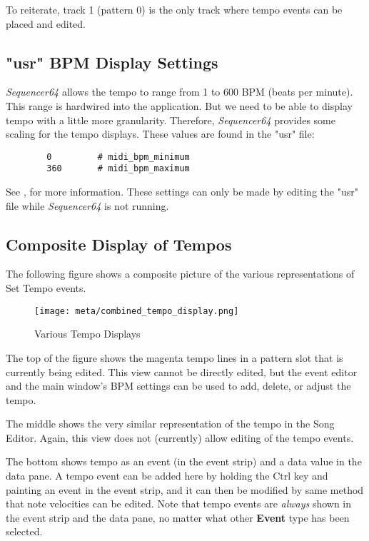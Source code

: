    To reiterate, track 1 (pattern 0) is the only track where tempo events
   can be placed and edited.

\subsection{"usr" BPM Display Settings}
\label{subsec:meta_events_usr}

   \textsl{Sequencer64} allows the tempo to range from 1 to 600 BPM
   (beats per minute).    This range is hardwired into the application.
   But we need to be able to display tempo with a little more granularity.
   Therefore, \textsl{Sequencer64} provides some scaling for the tempo
   displays.  These values are found in the "usr" file:

   \begin{verbatim}
		0         # midi_bpm_minimum
		360       # midi_bpm_maximum
   \end{verbatim}

   See , for more
   information.  These settings can only be made by editing the "usr" file
   while \textsl{Sequencer64} is not running.

\subsection{Composite Display of Tempos}
\label{subsec:meta_events_composite_display}

The following figure shows a composite picture of the various representations
of Set Tempo events.

\begin{figure}[H]
   \centering 
   \texttt{[image: meta/combined\_tempo\_display.png]}
   \caption{Various Tempo Displays}
   \label{fig:meta_events_tempo_displays}
\end{figure}

The top of the figure shows the magenta tempo lines in a pattern slot that
is currently being edited.  This view cannot be directly edited, but the event
editor and the main window's BPM settings can be used to add, delete, or adjust
the tempo.

The middle shows the very similar representation of the tempo in the Song
Editor.  Again, this view does not (currently) allow editing of the tempo events.

The bottom shows tempo as an event (in the event strip) and a data value
in the data pane.  A tempo event can be added here by holding the Ctrl key
and painting an event in the event strip, and it can then be modified by
same method that note velocities can be edited.  Note that tempo events 
are \textsl{always} shown in the event strip and the data pane, no matter
what other \textbf{Event} type has been selected.

